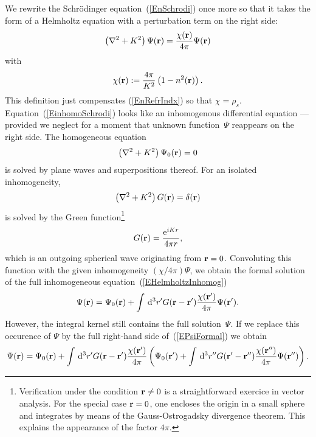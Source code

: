 We rewrite the Schrödinger equation~(\ref{EnSchrodi})
once more so that it takes the form of a Helmholtz equation
with a perturbation term on the right side:
\begin{equation}\label{EinhomoSchrodi}
  \left(\mathbf{\nabla}^2+K^2\right)\Psi(\mathbf{r})
  = \frac{\chi(\mathbf{r})}{4\pi}\Psi(\mathbf{r})
\end{equation}
with
\begin{equation}\label{EChiDef}
  \chi(\mathbf{r}) := \frac{4\pi}{K^2}\left(1-n^2(\mathbf{r})\right).
\end{equation}
This definition just compensates (\ref{EnRefrIndx}) so that $\chi=\rho_s$.
Equation~(\ref{EinhomoSchrodi}) looks
like an inhomogenous differential equation ---
provided we neglect for a moment that unknown function~$\Psi$
reappears on the right side.
The homogeneous equation
\begin{equation}\label{EHelmholtzHomog}
  \left(\mathbf{\nabla}^2+K^2\right)\Psi_0(\mathbf{r}) = 0
\end{equation}
is solved by plane waves and superpositions thereof.
For an isolated inhomogeneity,
\begin{equation}\label{EHelmholtzForGreen}
  \left(\mathbf{\nabla}^2+K^2\right)G(\mathbf{r}) = \delta(\mathbf{r})
\end{equation}
is solved by the Green function\footnote
{Verification under the condition $\mathbf{r}\ne0$
is a straightforward exercice in vector analysis.
For the special case $\mathbf{r}=0$,
one encloses the origin in a small sphere
and integrates by means of the Gauss-Ostrogadsky divergence theorem.
This explains the appearance of the factor $4\pi$.}
\begin{equation}\label{EGreens1}
  G(\mathbf{r}) = \frac{{\rm e}^{iKr}}{4\pi r},
\end{equation}
which is an outgoing spherical wave originating from $\mathbf{r}=0$.
Convoluting this function with the given inhomogeneity $(\chi/4\pi)\Psi$,
we obtain the formal solution
of the full inhomogeneous equation~(\ref{EHelmholtzInhomog})
\begin{equation}\label{EPsiFormal}
  \Psi(\mathbf{r})
  = \Psi_0(\mathbf{r})
  + \int\,{\rm d}^3r' G(\mathbf{r}-\mathbf{r'})
                     \frac{\chi(\mathbf{r'})}{4\pi}\Psi(\mathbf{r'}).
\end{equation}
However, the integral kernel still contains the full solution~$\Psi$.
If we replace this occurence of $\Psi$
by the full right-hand side of~(\ref{EPsiFormal})
we obtain
\begin{equation}
  \Psi(\mathbf{r})
  = \Psi_0(\mathbf{r})
  + \int\,{\rm d}^3r' G(\mathbf{r}-\mathbf{r'})\frac{\chi(\mathbf{r'})}{4\pi}
  \left(\Psi_0(\mathbf{r'})
  + \int\,{\rm d}^3r''
  G(\mathbf{r'}-\mathbf{r''})\frac{\chi(\mathbf{r''})}{4\pi}
  \Psi(\mathbf{r''})\right).
\end{equation}
